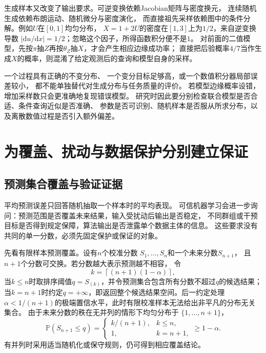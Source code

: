 生成样本又改变了输出要求。可逆变换依赖Jacobian矩阵与密度换元，
连续随机生成依赖布朗运动、随机微分与密度演化，
而直接祖先采样依赖图中的条件分解。例如$U$在$[0,1]$均匀分布，
$X=1+2U$的密度在$[1,3]$上为$1/2$，来自逆变换导数
$|\mathrm du/\mathrm dx|=1/2$；忽略这个因子，所得函数积分便不是$1$。
对前面的二值模型，先按$\pi$抽$Z$再按$\theta_Z$抽$X$，才会产生相应边缘成功率；
直接把后验概率$4/7$当作生成$X$的概率，则混淆了给定观测后的查询和模型自身的采样。

一个过程具有正确的不变分布、
一个变分目标足够高，或一个数值积分器局部误差较小，
都不能单独替代对生成分布与任务质量的评价。
若模型边缘概率设错，增加采样数只会更准确地复现错误模型。
研究时因此要分别检查联合模型是否合适、条件查询近似是否准确、
参数是否可识别、随机样本是否服从所求分布，以及离散数值过程是否引入额外偏差。

\section{为覆盖、扰动与数据保护分别建立保证}
\label{sec:future-trustworthy-machine-learning}

\subsection{预测集合覆盖与验证证据}
\label{sec:future-prediction-error-coverage-evidence}

平均预测误差只回答随机抽取一个样本时的平均表现。
可信机器学习会进一步询问：预测范围是否覆盖未来结果，输入受扰动后输出是否稳定，
不同群组或干预目标是否得到规定保障，算法输出是否泄露单个数据主体的信息。
这些要求没有共同的单一分数，必须先固定保护或保证的对象。

先看有限样本预测覆盖。设有$n$个校准分数
$S_1,\ldots,S_n$和一个未来分数$S_{n+1}$，
且$n+1$个分数可交换。若分数越大表示预测越不相容，
令
\[
  k=\left\lceil(n+1)(1-\alpha)\right\rceil,
\]
当$k\leq n$时取排序阈值$q=S_{(k)}$，并令预测集合包含所有分数不超过$q$的候选结果；
当$k=n+1$时约定$q=+\infty$，即返回整个候选结果空间。后一约定处理
$\alpha<1/(n+1)$的极端置信水平，此时有限校准样本无法给出非平凡的分布无关集合。
由于未来分数的秩在无并列的情形下均匀分布于
$\{1,\ldots,n+1\}$，
\begin{equation}
  \mathbb{P}(S_{n+1}\leq q)
  =
  \begin{cases}
    k/(n+1), & k\leq n,\\
    1, & k=n+1,
  \end{cases}
  \geq
  1-\alpha.
  \label{eq:future-exchangeable-coverage}
\end{equation}
有并列时采用适当随机化或保守规则，仍可得到相应覆盖结论。

